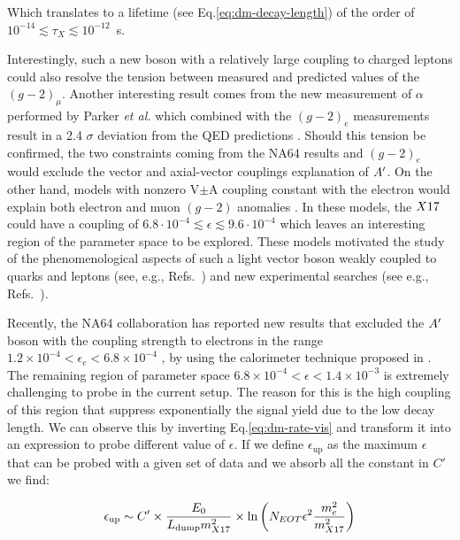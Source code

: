 Which translates to a lifetime (see Eq.\ref{eq:dm-decay-length}) of the order of $10^{-14}\lesssim \tau_X \lesssim 10^{-12}$~s.

Interestingly, such a new boson with a relatively large coupling to charged leptons could also resolve the tension between measured and predicted values of the $(g - 2)_{\mu}$. Another interesting result comes from the new measurement of $\alpha$ performed by Parker \textit{et al.} \cite{Parker191} which combined with the $(g-2)_e$ measurements result in a 2.4 $\sigma$ deviation from the QED predictions \cite{PhysRevLett.100.120801}. Should this tension be confirmed, the two constraints coming from the NA64 results and $(g - 2)_e$ would exclude the vector and axial-vector couplings explanation of $A'$. On the other hand, models with nonzero V$\pm$A coupling constant with the electron would explain both electron and muon $(g - 2)$ anomalies \cite{Krasnikov:2019dgh}. In these models, the $X17$ could have a coupling of $6.8\cdot 10^{-4} \lesssim \epsilon \lesssim 9.6 \cdot 10^{-4}$ which leaves an interesting region of the parameter space to be explored. These models motivated the study of the phenomenological aspects of such a light vector boson weakly coupled to quarks and leptons (see, e.g., Refs.~\cite{fayet1, fayet2, fayet3, fayet4,jk, cheng, Zhang:2017zap, ia, liang, bart}) and new experimental searches (see e.g., Refs.~\cite{battaglieri2017cosmic, nardi}).

Recently, the NA64 collaboration has reported new results that excluded the $A'$ boson  with the coupling strength  to electrons in the range $1.2 \times 10^{-4} < \epsilon_e < 6.8 \times 10^{-4}$ \cite{Banerjee:2018vgk,Banerjee:2019hmi}, by using the calorimeter technique proposed in \cite{Gninenko:2013rka,Andreas:2013lya}. The remaining region of parameter space $6.8 \times 10^{-4} < \epsilon < 1.4 \times 10^{-3}$ is extremely challenging to probe in the current setup. The reason for this is the high coupling of this region that suppress exponentially the signal yield due to the low decay length. We can observe this by inverting Eq.\ref{eq:dm-rate-vis} and transform it into an expression to probe different value of $\epsilon$. If we define $\epsilon_{\textrm{up}}$ as the maximum $\epsilon$ that can be probed with a given set of data and we absorb all the constant in $C'$ we find:

\begin{equation}
  \label{eq:x17-coverage}
  \epsilon_{\textrm{up}} \sim C' \times \frac{E_0}{L_{\textrm{dump}}m^2_{X17}} \times \ln{\left(N_{EOT} \epsilon^2 \frac{m_e^2}{m_{X17}^2}\right)}
\end{equation}

